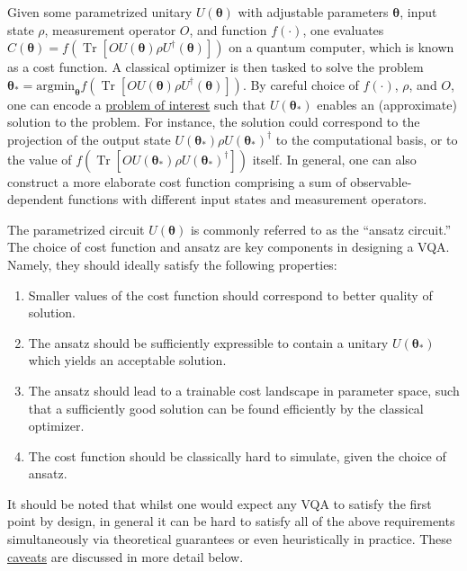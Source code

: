 \begin{refsection}
Given some parametrized unitary $U(\boldsymbol{\theta})$ with adjustable parameters $\boldsymbol{\theta}$, input state $\rho$, measurement operator $O$, and function $f(\cdot)$, one evaluates $C(\boldsymbol{\theta})=f\left(\operatorname{Tr}\left[O U(\boldsymbol{\theta}) \rho U^{\dagger}(\boldsymbol{\theta})\right] \right)$ on a quantum computer, which is known as a cost function.  A classical optimizer is then tasked to solve the problem $\boldsymbol{\theta}_*=\textrm{argmin}_{\boldsymbol{\theta}}f\left(\operatorname{Tr}[O U(\boldsymbol{\theta}) \rho U^{\dagger}(\boldsymbol{\theta})]\right)$. By careful choice of $f(\cdot)$, $\rho$, and $O$, one can encode a \hyperref[sec:variational-examples]{problem of interest}
such that $U(\boldsymbol{\theta}_*)$ enables an (approximate) solution to the problem. For instance, the solution could correspond to the projection of the output state $U(\boldsymbol{\theta}_*)\rho U(\boldsymbol{\theta}_*)^{\dagger}$ to the computational basis, or to the value of $f(\operatorname{Tr}[O U(\boldsymbol{\theta}_*) \rho U(\boldsymbol{\theta}_*)^{\dagger}])$ itself. In general, one can also construct a more elaborate cost function comprising a sum of observable-dependent functions with different input states and measurement operators. 

The parametrized circuit $U(\boldsymbol{\theta})$ is commonly referred to as the ``ansatz circuit.'' The choice of cost function and ansatz are key components in designing a VQA. Namely, they should ideally satisfy the following properties:
\begin{enumerate}
    \item Smaller values of the cost function should correspond to better quality of solution. 
    \item The ansatz should be sufficiently expressible to contain a unitary $U(\boldsymbol{\theta}_*)$ which yields an acceptable solution.
    \item The ansatz should lead to a trainable cost landscape in parameter space, such that a sufficiently good solution can be found efficiently by the classical optimizer.
    \item The cost function should be classically hard to simulate, given the choice of ansatz.
\end{enumerate}
It should be noted that whilst one would expect any VQA to satisfy the first point by design, in general it can be hard to satisfy all of the above requirements simultaneously via theoretical guarantees or even heuristically in practice. These \hyperref[sec:variational-caveats]{caveats} are discussed in more detail below.



\end{refsection}
